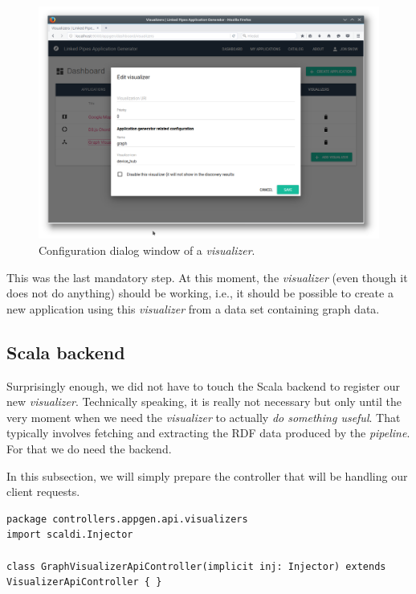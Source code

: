 \begin{figure}
	\centering
	\includegraphics[width=140mm]{img/05_edit_visualizer.png}
	\caption{Configuration dialog window of a \emph{visualizer}.} 
	\label{fig:edit-visualizer}
\end{figure}
This was the last mandatory step. At this moment, the \emph{visualizer} (even though it does not do anything) should be working, i.e., it should be possible to create a new application using this \emph{visualizer} from a data set containing graph data.

\subsection{Scala backend}
\label{sec:implementation:integrating-visualizer:6}

Surprisingly enough, we did not have to touch the Scala backend to register our new \emph{visualizer}. Technically speaking, it is really not necessary but only until the very moment when we need the \emph{visualizer} to actually \textit{do something useful}. That typically involves fetching and extracting the RDF data produced by the \emph{pipeline}. For that we do need the backend.

In this subsection, we will simply prepare the controller that will be handling our client requests.

\begin{verbatim}
package controllers.appgen.api.visualizers
import scaldi.Injector

class GraphVisualizerApiController(implicit inj: Injector) extends VisualizerApiController { }
\end{verbatim}

